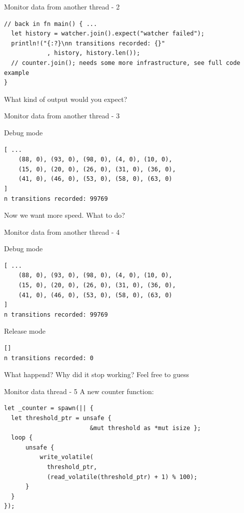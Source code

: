 \documentclass[10pt,aspectratio=169]{beamer}
\begin{document}
\begin{frame}[fragile]{Monitor data from another thread - 2}
\begin{verbatim}
// back in fn main() { ...
  let history = watcher.join().expect("watcher failed");
  println!("{:?}\nn transitions recorded: {}"
            , history, history.len());
  // counter.join(); needs some more infrastructure, see full code example
}
\end{verbatim}
What kind of output would you \alert{expect}?

\end{frame}



\begin{frame}[fragile]{Monitor data from another thread - 3}

      \begin{alertblock}{Debug mode}
\begin{verbatim}
[ ...
    (88, 0), (93, 0), (98, 0), (4, 0), (10, 0),
    (15, 0), (20, 0), (26, 0), (31, 0), (36, 0),
    (41, 0), (46, 0), (53, 0), (58, 0), (63, 0)
]
n transitions recorded: 99769
\end{verbatim}
      \end{alertblock}

    Now we want more speed. What to do?
\end{frame}
\begin{frame}[fragile]{Monitor data from another thread - 4}

      \begin{block}{Debug mode}
\begin{verbatim}
[ ...
    (88, 0), (93, 0), (98, 0), (4, 0), (10, 0),
    (15, 0), (20, 0), (26, 0), (31, 0), (36, 0),
    (41, 0), (46, 0), (53, 0), (58, 0), (63, 0)
]
n transitions recorded: 99769
\end{verbatim}
      \end{block}

    \begin{alertblock}{Release mode}
\begin{verbatim}
[]
n transitions recorded: 0
\end{verbatim}
      \end{alertblock}

    What happend? Why did it stop working? Feel free to guess
\end{frame}

\begin{frame}[fragile]{Monitor data thread - 5}
    A new counter function:
\begin{verbatim}
let _counter = spawn(|| {
  let threshold_ptr = unsafe {
                        &mut threshold as *mut isize };
  loop {
      unsafe {
          write_volatile(
            threshold_ptr,
            (read_volatile(threshold_ptr) + 1) % 100);
      }
  }
});
\end{verbatim}
\end{frame}
\end{document}
